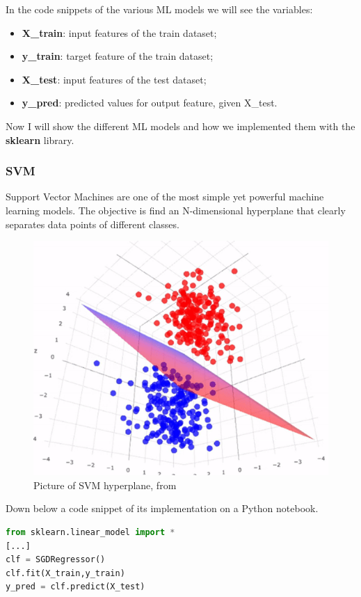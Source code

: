 In the code snippets of the various ML models we will see the variables:
\begin{itemize}
    \item \textbf{X\_train}: input features of the train dataset;
    \item \textbf{y\_train}: target feature of the train dataset;
    \item \textbf{X\_test}: input features of the test dataset;
    \item \textbf{y\_pred}: predicted values for output feature, given X\_test.
\end{itemize}

Now I will show the different ML models and how we implemented them with the \textbf{sklearn} library.

\subsubsection{SVM}
Support Vector Machines are one of the most simple yet powerful machine learning models. The objective is find an N-dimensional hyperplane that clearly separates data points of different classes.

\begin{figure}
    \centering
    \includegraphics[scale=0.6]{res/ML/svm.png}
    \caption{Picture of SVM hyperplane, from \cite{mediumSvm}}
\end{figure}

Down below a code snippet of its implementation on a Python notebook.

\begin{lstlisting}[language=Python, caption=SVM implementation]
from sklearn.linear_model import *
[...]
clf = SGDRegressor()
clf.fit(X_train,y_train)
y_pred = clf.predict(X_test)
\end{lstlisting}

